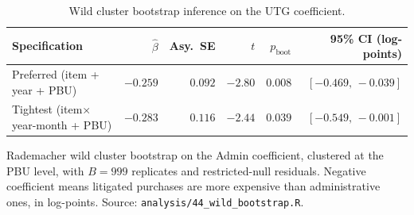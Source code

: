 \begin{table}[ht]
\centering
\caption{Wild cluster bootstrap inference on the UTG coefficient.}
\label{tab:utg_boottest}
\begin{threeparttable}
\begin{tabular}{lrrrrr}
\toprule
Specification & $\hat\beta$ & Asy.\ SE & $t$ & $p_{\text{boot}}$ & 95\% CI (log-points) \\
\midrule
Preferred (item + year + PBU)        & $-0.259$ & $0.092$ & $-2.80$ & $0.008$ & $[-0.469,\,-0.039]$ \\
Tightest (item$\times$year-month + PBU) & $-0.283$ & $0.116$ & $-2.44$ & $0.039$ & $[-0.549,\,-0.001]$ \\
\bottomrule
\end{tabular}
\begin{tablenotes}[flushleft]\footnotesize
\item Rademacher wild cluster bootstrap on the Admin coefficient,
clustered at the PBU level, with $B=999$ replicates and
restricted-null residuals. Negative coefficient means litigated
purchases are more expensive than administrative ones, in log-points.
Source: \texttt{analysis/44\_wild\_bootstrap.R}.
\end{tablenotes}
\end{threeparttable}
\end{table}
